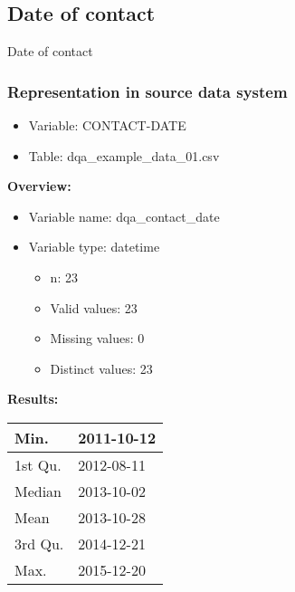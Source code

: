 \documentclass[
]{article}
\providecommand{\tightlist}{%
  \setlength{\itemsep}{0pt}\setlength{\parskip}{0pt}}
\begin{document}
\newpage

\hypertarget{date-of-contact}{%
\subsection{Date of contact}\label{date-of-contact}}

Date of contact

\hypertarget{representation-in-source-data-system-5}{%
\subsubsection{\texorpdfstring{Representation in \textbf{source} data
system}{Representation in source data system}}\label{representation-in-source-data-system-5}}

\begin{itemize}
\tightlist
\item
  Variable: CONTACT-DATE
\item
  Table: dqa\_example\_data\_01.csv
\end{itemize}

\textbf{Overview:}

\begin{itemize}
\tightlist
\item
  Variable name: dqa\_contact\_date
\item
  Variable type: datetime

  \begin{itemize}
  \tightlist
  \item
    n: 23
  \item
    Valid values: 23
  \item
    Missing values: 0
  \item
    Distinct values: 23
  \end{itemize}
\end{itemize}

\textbf{Results:}\\

\begin{table}[H]
\centering
\begin{tabular}{l|l}
\hline
Min. & 2011-10-12\\
\hline
1st Qu. & 2012-08-11\\
\hline
Median & 2013-10-02\\
\hline
Mean & 2013-10-28\\
\hline
3rd Qu. & 2014-12-21\\
\hline
Max. & 2015-12-20\\
\hline
\end{tabular}
\end{table}
\end{document}
